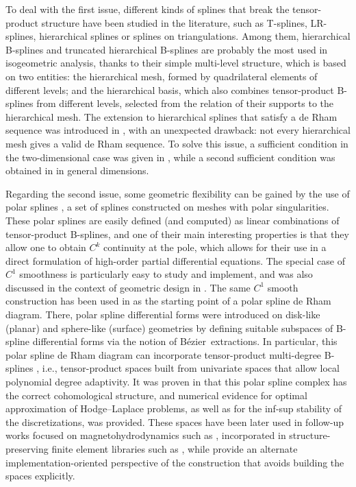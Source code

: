 \documentclass[10pt]{article}
\newcommand{\Bezier}{B\'ezier~}
\theoremstyle{plain}
\theoremstyle{definition}
\theoremstyle{remark}
\begin{document}
To deal with the first issue, different kinds of splines that break the tensor-product structure have been studied in the literature, such as T-splines, LR-splines, hierarchical splines or splines on triangulations. Among them, hierarchical B-splines \cite{Vuong:2011} and truncated hierarchical B-splines \cite{Giannelli:2012,Giannelli:2014}  are probably the most used in isogeometric analysis, thanks to their simple multi-level structure, which is based on two entities: the hierarchical mesh, formed by quadrilateral elements of different levels; and the hierarchical basis, which also combines tensor-product B-splines from different levels, selected from the relation of their supports to the hierarchical mesh. The extension to hierarchical splines that satisfy a de Rham sequence was introduced in \cite{Evans:2020}, with an unexpected drawback: not every hierarchical mesh gives a valid de Rham sequence. To solve this issue, a sufficient condition in the two-dimensional case was given in \cite{Evans:2020}, while a second sufficient condition was obtained in \cite{Shepherd:2024} in general dimensions.%

Regarding the second issue, some geometric flexibility can be gained by the use of polar splines \cite{Toshniwal:2017}, a set of splines constructed on meshes with polar singularities.
These polar splines are easily defined (and computed) as linear combinations of
tensor-product B-splines, and one of their main interesting properties is that they allow
one to obtain $C^k$ continuity at the pole, which allows for their use in a direct formulation of high-order partial differential equations.
The special case of $C^1$ smoothness is particularly easy to study and implement, and was also discussed in the context of geometric design in \cite{Speleers:2021}.
The same $C^1$ smooth construction has been used in \cite{Toshniwal:2021} as the starting point of a polar spline de Rham diagram.
There, polar spline differential forms were introduced on disk-like (planar) and sphere-like (surface) geometries by defining suitable subspaces of B-spline differential forms via the notion of \Bezier extractions.
In particular, this polar spline de Rham diagram can incorporate tensor-product multi-degree B-splines \cite{Toshniwal:2020}, i.e., tensor-product spaces built from univariate spaces that allow local polynomial degree adaptivity.
It was proven in \cite{Toshniwal:2021} that this polar spline complex has the correct cohomological structure, and numerical evidence for optimal approximation of Hodge--Laplace problems, as well as for the inf-sup stability of the discretizations, was provided.
These spaces have been later used in follow-up works focused on  magnetohydrodynamics such as \cite{Holderied:2022,Possanner:2023}, incorporated in structure-preserving finite element libraries such as \cite{Holderied:2022b,Cabanas:2026}, while \cite{Gucclu:2025} provide an alternate implementation-oriented perspective of the construction that avoids building the spaces explicitly.
\end{document}
